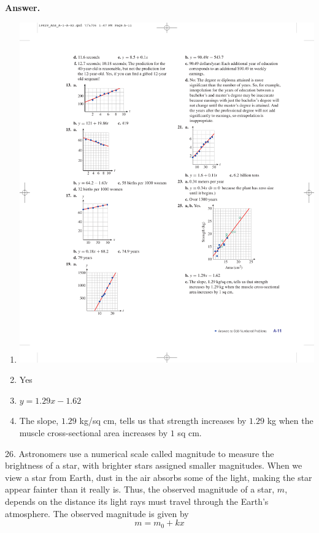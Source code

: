 \documentclass[10pt,]{book}
\theoremstyle{plain}
\theoremstyle{definition}
\theoremstyle{definition}
\theoremstyle{definition}
\theoremstyle{definition}
\numberwithin{equation}{part}
\begin{document}
\begin{exerciselist}
\par\smallskip
\noindent\textbf{Answer.}\hypertarget{answer-214}{}\quad
\leavevmode%
\begin{multicols}{2}
\begin{enumerate}[label=*\alph**]
\item\hypertarget{li-1455}{}\includegraphics[width=0.8\linewidth]{images/fig-ans-1-6-25}
%
\item\hypertarget{li-1456}{}Yes%
\item\hypertarget{li-1457}{}\(y = 1.29x - 1.62\)%
\item\hypertarget{li-1458}{}The slope, \(1.29\) kg/sq cm, tells us that strength increases by \(1.29\) kg when the muscle cross-sectional area increases by \(1\) sq cm.%
\end{enumerate}
\end{multicols}
%
\item[26.]\hypertarget{exercise-382}{}Astronomers use a numerical scale called magnitude to measure the brightness of a star, with brighter stars assigned smaller magnitudes. When we view a star from Earth, dust in the air absorbs some of the light, making the star appear fainter than it really is. Thus, the observed magnitude of a star, \(m\), depends on the distance its light rays must travel through the Earth's atmosphere. The observed magnitude is given by%
\begin{equation*}
m = m_0 + kx
\end{equation*}

\end{exerciselist}
\end{document}
